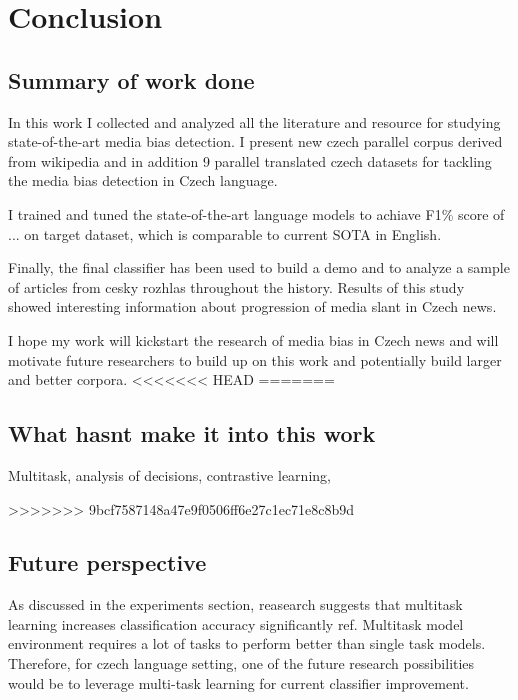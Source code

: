 \chapter{Conclusion}
\section{Summary of work done}
In this work I collected and analyzed all the literature and resource for studying state-of-the-art media bias detection. I present new czech parallel corpus derived from wikipedia and in addition 9 parallel translated czech datasets for tackling the media bias detection in Czech language.

I trained and tuned the state-of-the-art language models to achiave F1\% score of ... on target dataset, which is comparable to current SOTA in English.

Finally, the final classifier has been used to build a demo and to analyze a sample of articles from cesky rozhlas throughout the history. Results of this study showed interesting information about progression of media slant in Czech news.

I hope my work will kickstart the research of media bias in Czech news and will motivate future researchers to build up on this work and potentially build larger and better corpora.
<<<<<<< HEAD
=======

\section{What hasnt make it into this work}
Multitask, analysis of decisions, contrastive learning, 

>>>>>>> 9bcf7587148a47e9f0506ff6e27c1ec71e8c8b9d
\section{Future perspective}
As discussed in the experiments section, reasearch suggests that multitask learning increases classification accuracy significantly ref. Multitask model environment requires a lot of tasks \cite{aribandi2021ext5} to perform better than single task models. Therefore, for czech language setting, one of the future research possibilities would be to leverage multi-task learning for current classifier improvement. 
